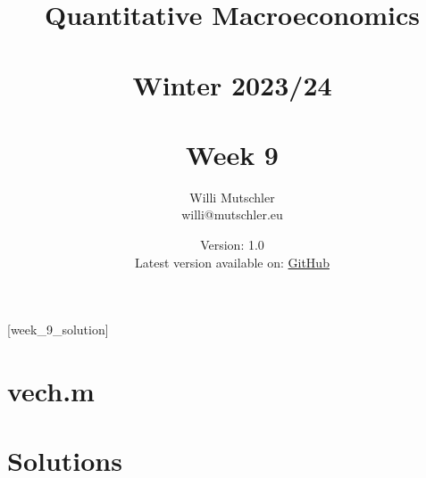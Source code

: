 
\newif\ifDisplaySolutions\DisplaySolutionstrue


\title{Quantitative Macroeconomics\\~\\Winter 2023/24\\~\\Week 9}
\author{Willi Mutschler\\willi@mutschler.eu}
\date{Version: 1.0\\Latest version available on: \href{https://github.com/wmutschl/Quantitative-Macroeconomics/releases/latest/download/week_9.pdf}{GitHub}}
\maketitle\thispagestyle{empty}

\newpage
{}[week_9_solution]
\tableofcontents\thispagestyle{empty}\newpage

\setcounter{page}{1}
\newpage
\newpage
\newpage

\printbibliography
\appendix
\section{vech.m}



\ifDisplaySolutions%
\newpage
\appendix
\section{Solutions}

\fi

